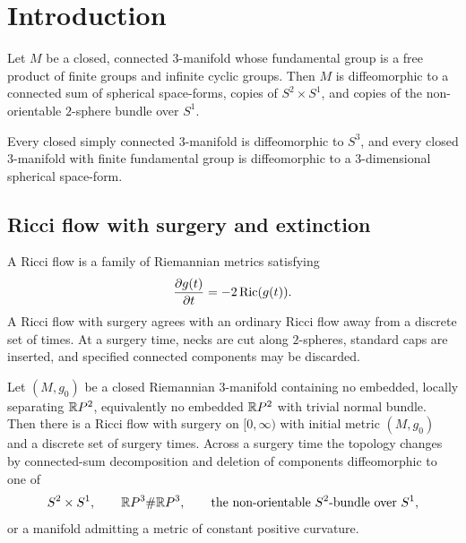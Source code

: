 \chapter*{Introduction}
\label{chap:introduction}

\begin{theorem}
\label{thm:classification-fundamental-group-free-product}
\label{Theorem1}
Let $M$ be a closed, connected $3$-manifold whose fundamental group is a
free product of finite groups and infinite cyclic groups. Then $M$ is
diffeomorphic to a connected sum of spherical space-forms, copies of
$S^2\times S^1$, and copies of the non-orientable $2$-sphere bundle over
$S^1$.
\end{theorem}

\begin{corollary}
\label{cor:poincare-and-spherical-space-form}

Every closed simply connected $3$-manifold is diffeomorphic to $S^3$, and
every closed $3$-manifold with finite fundamental group is diffeomorphic to a
$3$-dimensional spherical space-form.
\end{corollary}

\section{Ricci flow with surgery and extinction}

A Ricci flow is a family of Riemannian metrics satisfying
\[
  \frac{\partial g(t)}{\partial t}=-2\operatorname{Ric}(g(t)).
\]
A Ricci flow with surgery agrees with an ordinary Ricci flow away from a
discrete set of times. At a surgery time, necks are cut along $2$-spheres,
standard caps are inserted, and specified connected components may be
discarded.

\begin{theorem}
\label{thm:ricci-flow-surgery-existence}
\label{surgery}
Let $(M,g_0)$ be a closed Riemannian $3$-manifold containing no embedded,
locally separating $\mathbb{R} P^2$, equivalently no embedded $\mathbb{R} P^2$ with trivial
normal bundle. Then there is a Ricci flow with surgery on $[0,\infty)$ with
initial metric $(M,g_0)$ and a discrete set of surgery times. Across a surgery
time the topology changes by connected-sum decomposition and deletion of
components diffeomorphic to one of
\[
  S^2\times S^1,\qquad \mathbb{R} P^3\#\mathbb{R} P^3,\qquad
  \text{the non-orientable $S^2$-bundle over $S^1$},
\]
or a manifold admitting a metric of constant positive curvature.
\end{theorem}

